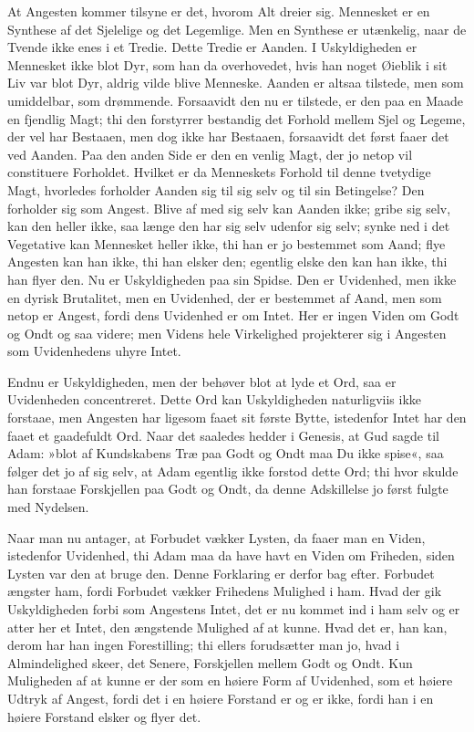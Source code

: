 \documentclass[12pt,a4paper]{article}
\begin{document}
At Angesten kommer tilsyne er det, hvorom Alt dreier sig. Mennesket er en Synthese af det Sjelelige og det Legemlige. Men en Synthese er utænkelig, naar de Tvende ikke enes i et Tredie. Dette Tredie er Aanden. I Uskyldigheden er Mennesket ikke blot Dyr, som han da overhovedet, hvis han noget Øieblik i sit Liv var blot Dyr, aldrig vilde blive Menneske. Aanden er altsaa tilstede, men som umiddelbar, som drømmende. Forsaavidt den nu er tilstede, er den paa en Maade en fjendlig Magt; thi den forstyrrer bestandig det Forhold mellem Sjel og Legeme, der vel har Bestaaen, men dog ikke har Bestaaen, forsaavidt det først faaer det ved Aanden. Paa den anden Side er den en venlig Magt, der jo netop vil constituere Forholdet. Hvilket er da Menneskets Forhold til denne tvetydige Magt, hvorledes forholder Aanden sig til sig selv og til sin Betingelse? Den forholder sig som Angest. Blive af med sig selv kan Aanden ikke; gribe sig selv, kan den heller ikke, saa længe den har sig selv udenfor sig selv; synke ned i det Vegetative kan Mennesket heller ikke, thi han er jo bestemmet som Aand; flye Angesten kan han ikke, thi han elsker den; egentlig elske den kan han ikke, thi han flyer den. Nu er Uskyldigheden paa sin Spidse. Den er Uvidenhed, men ikke en dyrisk Brutalitet, men en Uvidenhed, der er bestemmet af Aand, men som netop er Angest, fordi dens Uvidenhed er om Intet. Her er ingen Viden om Godt og Ondt og saa videre; men Videns hele Virkelighed projekterer sig i Angesten som Uvidenhedens uhyre Intet.

Endnu er Uskyldigheden, men der behøver blot at lyde et Ord, saa er Uvidenheden concentreret. Dette Ord kan Uskyldigheden naturligviis ikke forstaae, men Angesten har ligesom faaet sit første Bytte, istedenfor Intet har den faaet et gaadefuldt Ord. Naar det saaledes hedder i Genesis, at Gud sagde til Adam: »blot af Kundskabens Træ paa Godt og Ondt maa Du ikke spise«, saa følger det jo af sig selv, at Adam egentlig ikke forstod dette Ord; thi hvor skulde han forstaae Forskjellen paa Godt og Ondt, da denne Adskillelse jo først fulgte med Nydelsen.

Naar man nu antager, at Forbudet vækker Lysten, da faaer man en Viden, istedenfor Uvidenhed, thi Adam maa da have havt en Viden om Friheden, siden Lysten var den at bruge den. Denne Forklaring er derfor bag efter. Forbudet ængster ham, fordi Forbudet vækker Frihedens Mulighed i ham. Hvad der gik Uskyldigheden forbi som Angestens Intet, det er nu kommet ind i ham selv og er atter her et Intet, den ængstende Mulighed af at kunne. Hvad det er, han kan, derom har han ingen Forestilling; thi ellers forudsætter man jo, hvad i Almindelighed skeer, det Senere, Forskjellen mellem Godt og Ondt. Kun Muligheden af at kunne er der som en høiere Form af Uvidenhed, som et høiere Udtryk af Angest, fordi det i en høiere Forstand er og er ikke, fordi han i en høiere Forstand elsker og flyer det.
\end{document}
